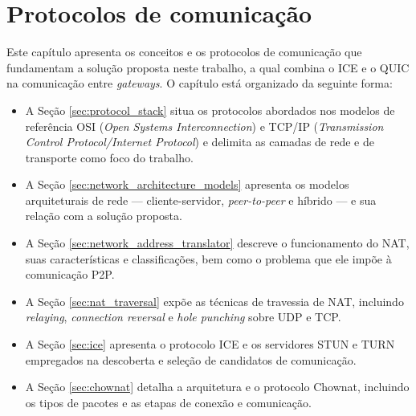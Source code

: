 \chapter{Protocolos de comunicação}
\label{chap:background}

Este capítulo apresenta os conceitos e os protocolos de comunicação que fundamentam a solução proposta neste trabalho, a qual combina o ICE e o QUIC na comunicação entre \textit{gateways}. O capítulo está organizado da seguinte forma: 

\begin{itemize}

\item A Seção \ref{sec:protocol_stack} situa os protocolos abordados nos modelos de referência OSI (\textit{Open Systems Interconnection}) e TCP/IP (\textit{Transmission Control Protocol/Internet Protocol}) e delimita as camadas de rede e de transporte como foco do trabalho.

\item A Seção \ref{sec:network_architecture_models} apresenta os modelos arquiteturais de rede --- cliente-servidor, \textit{peer-to-peer} e híbrido --- e sua relação com a solução proposta.

\item A Seção \ref{sec:network_address_translator} descreve o funcionamento do NAT, suas características e classificações, bem como o problema que ele impõe à comunicação P2P.

\item A Seção \ref{sec:nat_traversal} expõe as técnicas de travessia de NAT, incluindo \textit{relaying}, \textit{connection reversal} e \textit{hole punching} sobre UDP e TCP.

\item A Seção \ref{sec:ice} apresenta o protocolo ICE e os servidores STUN e TURN empregados na descoberta e seleção de candidatos de comunicação.

\item A Seção \ref{sec:chownat} detalha a arquitetura e o protocolo Chownat, incluindo os tipos de pacotes e as etapas de conexão e comunicação.

\end{itemize}

